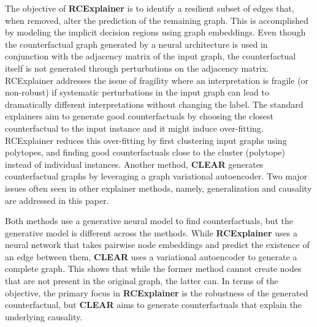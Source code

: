 The objective of \textbf{RCExplainer} \cite{robust-counter} is to identify a resilient subset of edges that, when removed, alter the prediction of the remaining graph. This is accomplished by modeling the implicit decision regions using graph embeddings.
Even though the counterfactual graph generated by a neural architecture is used in conjunction with the adjacency matrix of the input graph, the counterfactual itself is not generated through perturbations on the adjacency matrix. RCExplainer addresses the issue of fragility where an interpretation is fragile (or non-robust) if systematic perturbations in the input graph can lead to dramatically different interpretations without changing the label. The standard explainers aim to generate good counterfactuals by choosing the closest counterfactual to the input instance and it might induce over-fitting. RCExplainer reduces this over-fitting by first clustering input graphs using polytopes, and finding good counterfactuals close to the cluster (polytope) instead of individual instances. Another method, \textbf{CLEAR} \cite{clear-counter} generates counterfactual graphs by leveraging a graph variational autoencoder. Two major issues often seen in other explainer methods, namely, generalization and causality are addressed in this paper.

Both methods use a generative neural model to find counterfactuals, but the generative model is different across the methods. While \textbf{RCExplainer} \cite{robust-counter} uses a neural network that takes pairwise node embeddings and predict the existence of an edge between them, \textbf{CLEAR} \cite{clear-counter} uses a variational autoencoder to generate a complete graph. This shows that while the former method cannot create nodes that are not present in the original graph, the latter can. In terms of the objective, the primary focus in \textbf{RCExplainer} \cite{robust-counter} is the robustness of the generated counterfactual, but \textbf{CLEAR} \cite{clear-counter} aims to generate counterfactuals that explain the underlying causality.





